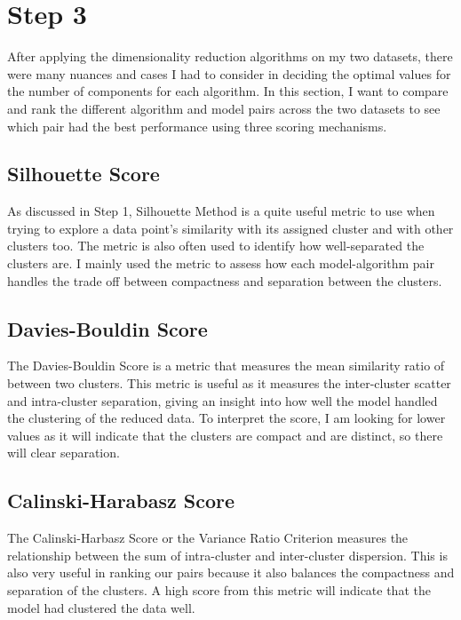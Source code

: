 \documentclass[conference]{IEEEtran}
\begin{document}
\section{Step 3}
After applying the dimensionality reduction algorithms on my two datasets, there were many nuances and cases I had to consider in deciding the optimal values for the number of components for each algorithm. In this section, I want to compare and rank the different algorithm and model pairs across the two datasets to see which pair had the best performance using three scoring mechanisms.
\subsection{Silhouette Score}
\par As discussed in Step 1, Silhouette Method is a quite useful metric to use when trying to explore a data point's similarity with its assigned cluster and with other clusters too. The metric is also often used to identify how well-separated the clusters are. I mainly used the metric to assess how each model-algorithm pair handles the trade off between compactness and separation between the clusters.

\subsection{Davies-Bouldin Score}
\par The Davies-Bouldin Score is a metric that measures the mean similarity ratio of between two clusters. This metric is useful as it measures the inter-cluster scatter and intra-cluster separation, giving an insight into how well the model handled the clustering of the reduced data. To interpret the score, I am looking for lower values as it will indicate that the clusters are compact and are distinct, so there will clear separation.
\subsection{Calinski-Harabasz Score}
The Calinski-Harbasz Score or the Variance Ratio Criterion measures the relationship between the sum of intra-cluster and inter-cluster dispersion. This is also very useful in ranking our pairs because it also balances the compactness and separation of the clusters. A high score from this metric will indicate that the model had clustered the data well.
\end{document}
